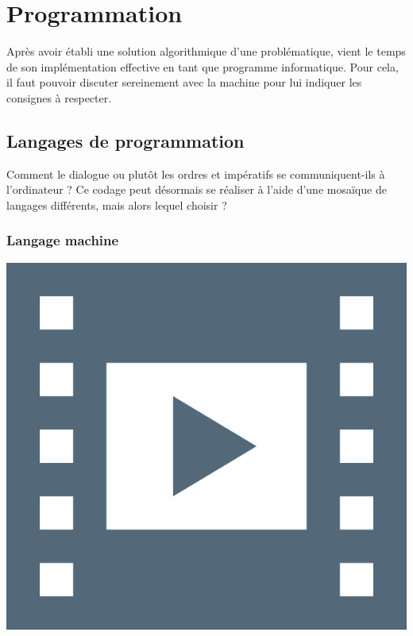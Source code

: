 \section[Programmation]{Programmation}
\label{sec:VI.2}

Après avoir établi une solution algorithmique d'une problématique, vient le temps de son implémentation effective en tant que programme informatique. Pour cela, il faut pouvoir discuter sereinement avec la machine pour lui indiquer les consignes à respecter. 



\subsection[Langages de programmation]{Langages de programmation}
\label{sub:VI.2.1}

Comment le dialogue ou plutôt les ordres et impératifs se communi\-quent-ils à l'ordinateur ? Ce codage peut désormais se réaliser à l'aide d'une mosaïque de langages différents, mais alors lequel choisir ?

\subsubsection[Langage machine]{Langage machine}
\label{subsub:VI.2.1.1}

\begin{marginvideo}
	[\label{vid:VI.5}Langage machine.]%
	\href{https://www.youtube.com/watch?v=fpDBjGW93Dk}%
	  {\includegraphics[width=\marginparwidth]{./Images/Pictograms/film-strip-dark-electric-blue.png}}%
\end{marginvideo}

